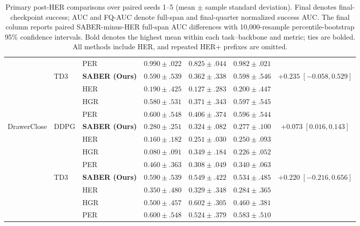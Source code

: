 \begin{table}[t]
\begin{tabular*}{\textwidth}{@{\extracolsep{\fill}}lllcccc@{}}
 & & PER & \(0.990 \pm .022\) & \(\mathbf{0.825 \pm .044}\) & \(0.982 \pm .021\) & \\
\addlinespace[2pt]
 & TD3 & \textbf{SABER (Ours)}
  & \(0.590 \pm .539\) & \(0.362 \pm .338\)
  & \(\mathbf{0.598 \pm .546}\) & \(+0.235\;[-0.058,0.529]\) \\
 & & HER & \(0.190 \pm .425\) & \(0.127 \pm .283\) & \(0.200 \pm .447\) & \\
 & & HGR & \(0.580 \pm .531\) & \(0.371 \pm .343\) & \(0.597 \pm .545\) & \\
 & & PER & \(\mathbf{0.600 \pm .548}\) & \(\mathbf{0.406 \pm .374}\) & \(0.596 \pm .544\) & \\
\midrule
DrawerClose & DDPG & \textbf{SABER (Ours)}
  & \(0.280 \pm .251\) & \(0.324 \pm .082\)
  & \(0.277 \pm .100\) & \(+0.073\;[0.016,0.143]\) \\
 & & HER & \(0.160 \pm .182\) & \(0.251 \pm .030\) & \(0.250 \pm .093\) & \\
 & & HGR & \(0.080 \pm .091\) & \(\mathbf{0.349 \pm .184}\) & \(0.226 \pm .052\) & \\
 & & PER & \(\mathbf{0.460 \pm .363}\) & \(0.308 \pm .049\) & \(\mathbf{0.340 \pm .063}\) & \\
\addlinespace[2pt]
 & TD3 & \textbf{SABER (Ours)}
  & \(0.590 \pm .539\) & \(0.549 \pm .422\)
  & \(0.534 \pm .485\) & \(+0.220\;[-0.216,0.656]\) \\
 & & HER & \(0.350 \pm .480\) & \(0.329 \pm .348\) & \(0.284 \pm .365\) & \\
 & & HGR & \(0.500 \pm .457\) & \(\mathbf{0.602 \pm .305}\) & \(0.460 \pm .381\) & \\
 & & PER & \(\mathbf{0.600 \pm .548}\) & \(0.524 \pm .379\) & \(\mathbf{0.583 \pm .510}\) & \\
\bottomrule
\end{tabular*}
\caption{Primary post-HER comparisons over paired seeds 1--5 (mean
$\pm$ sample standard deviation). Final denotes final-checkpoint success;
AUC and FQ-AUC denote full-span and final-quarter normalized success AUC.
The final column reports paired SABER-minus-HER full-span AUC differences
with 10,000-resample percentile-bootstrap 95\% confidence intervals.
Bold denotes the highest mean within each task--backbone and metric;
ties are bolded. All methods include HER, and repeated HER+ prefixes are
omitted.}
\label{tab:primary-posther-comparisons}
\end{table}

